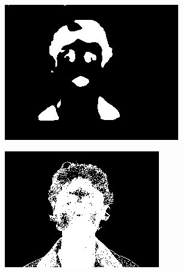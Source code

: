 \begin{figure}[h]
{\begin{subfigure}[b]{0.23\textwidth}
         \includegraphics[width=\textwidth]{images/results/cross_st/w-020-7.color.d3_dark_med_skinny_57.png}
     \end{subfigure}
    \hfill
     \begin{subfigure}[b]{0.23\textwidth}
         \centering
         \includegraphics[width=\textwidth]{images/results/cross_st/w-020-7.color.d3_dark_med_bayes.png}
     \end{subfigure}}
     

\end{figure}
